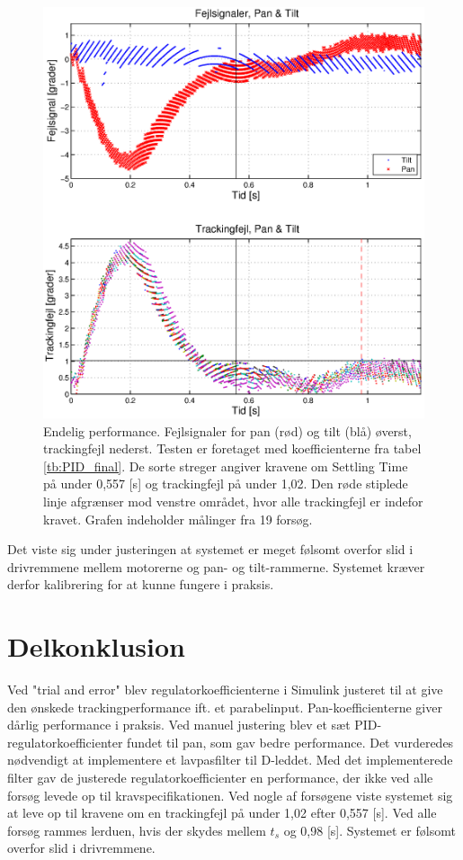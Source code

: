 \begin{figure}[h!]
\centering
\includegraphics[width=1\textwidth]{./graphics/pidPhys2.eps}
\captionsetup{width=1\textwidth}
\caption[Endelig performance]{Endelig performance. Fejlsignaler for pan (rød) og tilt (blå) øverst, trackingfejl nederst.
Testen er foretaget med koefficienterne fra tabel \ref{tb:PID_final}.
De sorte streger angiver kravene om Settling Time på under 0,557 [s] og trackingfejl på under 1,02\degree{}. 
Den røde stiplede linje afgrænser mod venstre området, hvor alle trackingfejl er 
indefor kravet.
Grafen indeholder målinger fra 19 forsøg.} 
\label{fig:PID_final}
\end{figure}

Det viste sig under justeringen at systemet er meget følsomt overfor slid i drivremmene mellem motorerne og pan- og tilt-rammerne.
Systemet kræver derfor kalibrering for at kunne fungere i praksis.

\section{Delkonklusion}
Ved "trial and error" blev regulatorkoefficienterne i Simulink justeret til at give den ønskede 
trackingperformance ift. et parabelinput. Pan-koefficienterne giver dårlig performance i praksis.
Ved manuel justering blev et sæt PID-regulatorkoefficienter fundet til pan, som gav bedre performance.
Det vurderedes nødvendigt at implementere et lavpasfilter til D-leddet.
Med det implementerede filter gav de justerede regulatorkoefficienter en performance,
der ikke ved alle forsøg levede op til kravspecifikationen. Ved nogle af forsøgene viste
systemet sig at leve op til kravene om en trackingfejl på under 1,02\degree{} efter 0,557 [s].
Ved alle forsøg rammes lerduen, hvis der skydes mellem \(t_s\) og 0,98 [s].
Systemet er følsomt overfor slid i drivremmene.